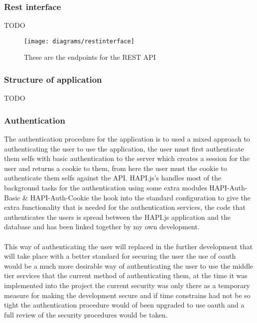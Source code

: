 \subsubsection*{Rest interface}

{TODO}

\begin{figure}[H]
    \centering
    \texttt{[image: diagrams/restinterface]}
    \caption{These are the endpoints for the REST API}
    \label{fig:rest_pai_diagram_image}
\end{figure} 
\noindent

\subsubsection*{Structure of application}

{TODO}

\subsubsection*{Authentication}

The authentication procedure for the application is to used a mixed approach to authenticating the user to use the application, the user must first authenticate them selfs with basic authentication to the server which creates a session for the user and returns a cookie to them, from here the user must the cookie to authenticate them selfs against the API. HAPI.js's handles most of the background tasks for the authentication using some extra modules HAPI-Auth-Basic \& HAPI-Auth-Cookie the hook into the standard configuration to give the extra functionality that is needed for the authentication services, the code that authenticates the users is spread between the HAPI.js application and the database and has been linked together by my own development.\\
\\
This way of authenticating the user will replaced in the further development that will take place with a better standard for securing the user the use of oauth would be a much more desirable way of authenticating the user to use the middle tier services that the current method of authenticating them, at the time it was implemented into the project the current security was only there as a temporary measure for making the development secure and if time constrains had not be so tight the authentication procedure would of been upgraded to use oauth and a full review of the security procedures would be taken.

